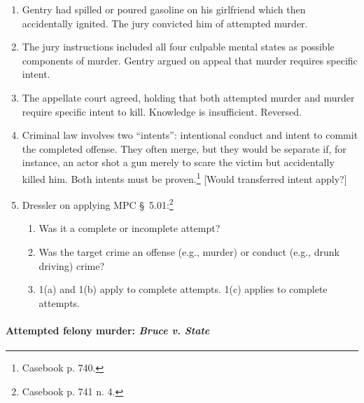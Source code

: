 \begin{enumerate}
    \item Gentry had spilled or poured gasoline on his girlfriend which then 
    accidentally ignited. The jury convicted him of attempted murder.
    \item The jury instructions included all four culpable mental states as 
    possible components of murder. Gentry argued on appeal that murder 
    requires specific intent.
    \item The appellate court agreed, holding that both attempted murder and 
    murder require specific intent to kill. Knowledge is insufficient. 
    Reversed.
    \item Criminal law involves two ``intents'': intentional conduct and 
    intent to commit the completed offense. They often merge, but they would 
    be separate if, for instance, an actor shot a gun merely to scare the 
    victim but accidentally killed him. Both intents must be 
    proven.\footnote{Casebook p. 740.} [Would transferred intent apply?]
    \item Dressler on applying MPC \S\ 5.01:\footnote{Casebook p. 741 n. 4.}
    \begin{enumerate}
        \item Was it a complete or incomplete attempt?
        \item Was the target crime an offense (e.g., murder) or conduct (e.g., 
        drunk driving) crime?
        \item 1(a) and 1(b) apply to complete attempts. 1(c) applies to 
        complete attempts.
    \end{enumerate}
\end{enumerate}

\paragraph{Attempted felony murder: \emph{Bruce v. State}}

